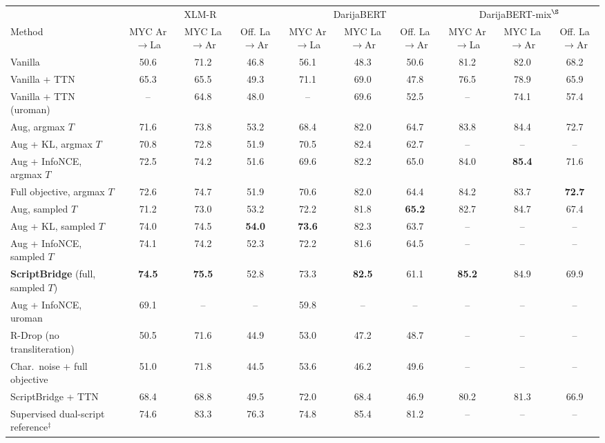 \begin{lrbox}{\tblbox}\footnotesize\setlength{\tabcolsep}{3.2pt}%
\begin{tabular}{@{}lccccccccc@{}}
\toprule
 & \multicolumn{3}{c}{XLM-R} & \multicolumn{3}{c}{DarijaBERT} & \multicolumn{3}{c}{DarijaBERT-mix$^{\S}$}\\
\cmidrule(lr){2-4}\cmidrule(lr){5-7}\cmidrule(lr){8-10}
Method & \shortstack{MYC\\Ar$\to$La} & \shortstack{MYC\\La$\to$Ar} & \shortstack{Off.\\La$\to$Ar} & \shortstack{MYC\\Ar$\to$La} & \shortstack{MYC\\La$\to$Ar} & \shortstack{Off.\\La$\to$Ar} & \shortstack{MYC\\Ar$\to$La} & \shortstack{MYC\\La$\to$Ar} & \shortstack{Off.\\La$\to$Ar}\\
\midrule
Vanilla & 50.6 & 71.2 & 46.8 & 56.1 & 48.3 & 50.6 & 81.2 & 82.0 & 68.2\\
Vanilla + TTN & 65.3 & 65.5 & 49.3 & 71.1 & 69.0 & 47.8 & 76.5 & 78.9 & 65.9\\
Vanilla + TTN (uroman) & -- & 64.8 & 48.0 & -- & 69.6 & 52.5 & -- & 74.1 & 57.4\\
\midrule
Aug, argmax $T$ & 71.6 & 73.8 & 53.2 & 68.4 & 82.0 & 64.7 & 83.8 & 84.4 & 72.7\\
Aug + KL, argmax $T$ & 70.8 & 72.8 & 51.9 & 70.5 & 82.4 & 62.7 & -- & -- & --\\
Aug + InfoNCE, argmax $T$ & 72.5 & 74.2 & 51.6 & 69.6 & 82.2 & 65.0 & 84.0 & \textbf{85.4} & 71.6\\
Full objective, argmax $T$ & 72.6 & 74.7 & 51.9 & 70.6 & 82.0 & 64.4 & 84.2 & 83.7 & \textbf{72.7}\\
\midrule
Aug, sampled $T$ & 71.2 & 73.0 & 53.2 & 72.2 & 81.8 & \textbf{65.2} & 82.7 & 84.7 & 67.4\\
Aug + KL, sampled $T$ & 74.0 & 74.5 & \textbf{54.0} & \textbf{73.6} & 82.3 & 63.7 & -- & -- & --\\
Aug + InfoNCE, sampled $T$ & 74.1 & 74.2 & 52.3 & 72.2 & 81.6 & 64.5 & -- & -- & --\\
\textbf{ScriptBridge} (full, sampled $T$) & \textbf{74.5} & \textbf{75.5} & 52.8 & 73.3 & \textbf{82.5} & 61.1 & \textbf{85.2} & 84.9 & 69.9\\
\midrule
Aug + InfoNCE, uroman & 69.1 & -- & -- & 59.8 & -- & -- & -- & -- & --\\
R-Drop (no transliteration) & 50.5 & 71.6 & 44.9 & 53.0 & 47.2 & 48.7 & -- & -- & --\\
Char.\ noise + full objective & 51.0 & 71.8 & 44.5 & 53.6 & 46.2 & 49.6 & -- & -- & --\\
\midrule
ScriptBridge + TTN & 68.4 & 68.8 & 49.5 & 72.0 & 68.4 & 46.9 & 80.2 & 81.3 & 66.9\\
\midrule
Supervised dual-script reference$^{\ddagger}$ & 74.6 & 83.3 & 76.3 & 74.8 & 85.4 & 81.2 & -- & -- & --\\
\bottomrule
\end{tabular}%
\end{lrbox}
